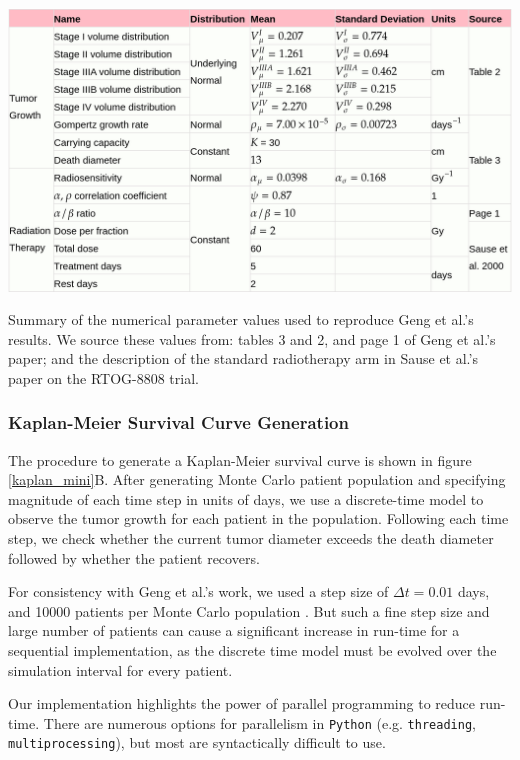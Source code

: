 \documentclass[letterpaper
, superscriptaddress
, twocolumn
, aps
]{revtex4}
\begin{document}
\begin{table}
	\includegraphics[scale=0.3]{Figures/table2.png}
	\caption{Summary of the numerical parameter values used to reproduce Geng et al.'s results. We source these values from: tables 3 and 2, and page 1 of Geng et al.'s paper; and the description of the standard radiotherapy arm in Sause et al.'s paper on the RTOG-8808 trial.}
	\label{table2}
\end{table}

\subsubsection{Kaplan-Meier Survival Curve Generation}
The procedure to generate a Kaplan-Meier survival curve is shown in figure \ref{kaplan_mini}B. After generating Monte Carlo patient population and specifying magnitude of each time step in units of days, we use a discrete-time model to observe the tumor growth for each patient in the population. Following each time step, we check whether the current tumor diameter exceeds the death diameter followed by whether the patient recovers.

For consistency with Geng et al.'s work, we used a step size of $\Delta t = 0.01$ days, and 10000 patients per Monte Carlo population \cite{Changran2018}. But such a fine step size and large number of patients can cause a significant increase in run-time for a sequential implementation, as the discrete time model must be evolved over the simulation interval for every patient. 

Our implementation highlights the power of parallel programming to reduce run-time. There are numerous options for parallelism in \texttt{Python} (e.g. \texttt{threading}, \texttt{multiprocessing}), but most are syntactically difficult to use. 
\end{document}
